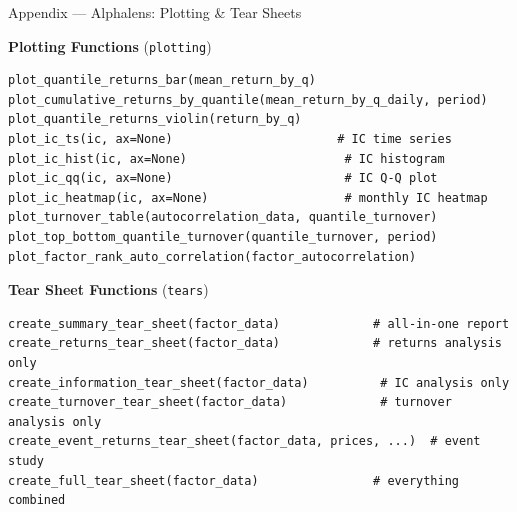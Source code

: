 \documentclass[aspectratio=169, 11pt]{beamer}
\begin{document}
%
%
\begin{frame}[fragile]{Appendix --- Alphalens: Plotting \& Tear Sheets}

\small

\textbf{Plotting Functions} (\texttt{plotting})
\begin{lstlisting}
plot_quantile_returns_bar(mean_return_by_q)
plot_cumulative_returns_by_quantile(mean_return_by_q_daily, period)
plot_quantile_returns_violin(return_by_q)
plot_ic_ts(ic, ax=None)                       # IC time series
plot_ic_hist(ic, ax=None)                      # IC histogram
plot_ic_qq(ic, ax=None)                        # IC Q-Q plot
plot_ic_heatmap(ic, ax=None)                   # monthly IC heatmap
plot_turnover_table(autocorrelation_data, quantile_turnover)
plot_top_bottom_quantile_turnover(quantile_turnover, period)
plot_factor_rank_auto_correlation(factor_autocorrelation)
\end{lstlisting}

\vspace{0.2cm}

\textbf{Tear Sheet Functions} (\texttt{tears})
\begin{lstlisting}
create_summary_tear_sheet(factor_data)             # all-in-one report
create_returns_tear_sheet(factor_data)             # returns analysis only
create_information_tear_sheet(factor_data)          # IC analysis only
create_turnover_tear_sheet(factor_data)             # turnover analysis only
create_event_returns_tear_sheet(factor_data, prices, ...)  # event study
create_full_tear_sheet(factor_data)                # everything combined
\end{lstlisting}

\end{frame}
%
%
\end{document}
